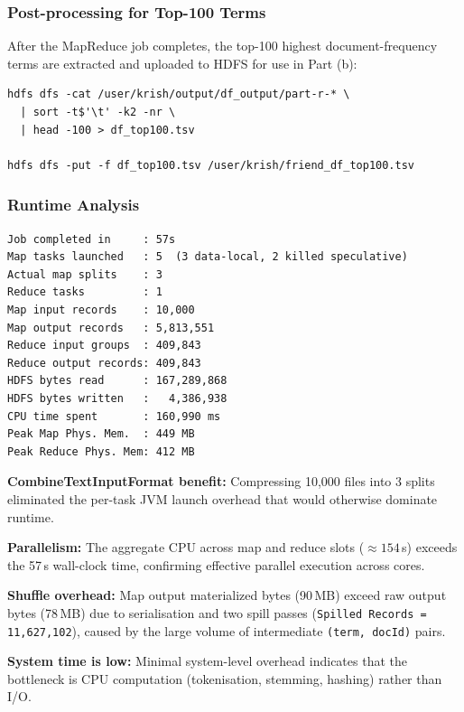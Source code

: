 \documentclass[12pt,a4paper]{article}
\begin{document}
\subsubsection{Post-processing for Top-100 Terms}

After the MapReduce job completes, the top-100 highest document-frequency
terms are extracted and uploaded to HDFS for use in Part (b):

\begin{lstlisting}[style=shellstyle]
hdfs dfs -cat /user/krish/output/df_output/part-r-* \
  | sort -t$'\t' -k2 -nr \
  | head -100 > df_top100.tsv

hdfs dfs -put -f df_top100.tsv /user/krish/friend_df_top100.tsv
\end{lstlisting}

\subsubsection{Runtime Analysis}

\begin{lstlisting}[style=shellstyle]
Job completed in     : 57s
Map tasks launched   : 5  (3 data-local, 2 killed speculative)
Actual map splits    : 3
Reduce tasks         : 1
Map input records    : 10,000
Map output records   : 5,813,551
Reduce input groups  : 409,843
Reduce output records: 409,843
HDFS bytes read      : 167,289,868
HDFS bytes written   :   4,386,938
CPU time spent       : 160,990 ms
Peak Map Phys. Mem.  : 449 MB
Peak Reduce Phys. Mem: 412 MB
\end{lstlisting}

\begin{insightbox}
\textbf{CombineTextInputFormat benefit:}
Compressing 10,000 files into 3 splits eliminated the per-task JVM launch
overhead that would otherwise dominate runtime.

\textbf{Parallelism:}
The aggregate CPU across map and reduce slots ($\approx 154$\,s) exceeds the
57\,s wall-clock time, confirming effective parallel execution across cores.

\textbf{Shuffle overhead:}
Map output materialized bytes (90\,MB) exceed raw output bytes (78\,MB) due to
serialisation and two spill passes
(\texttt{Spilled Records = 11,627,102}), caused by the large volume of
intermediate \texttt{(term, docId)} pairs.

\textbf{System time is low:}
Minimal system-level overhead indicates that the bottleneck is CPU computation
(tokenisation, stemming, hashing) rather than I/O.
\end{insightbox}
\end{document}
